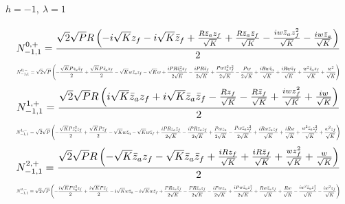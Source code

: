 \documentclass[10pt]{article}
\begin{document}
\paragraph{$h=-1,\ \lambda=1$}
\begin{equation*}
\resizebox{0.98\textwidth}{!}{${\displaystyle N^{0,+}_{-1,1}=\frac{\sqrt{2} \sqrt{P} R \left(- i \sqrt{K} z_f - i \sqrt{K} \bar z_f + \frac{R \bar z_a z_f}{\sqrt{K}} + \frac{R \bar z_a \bar z_f}{\sqrt{K}} - \frac{i w \bar z_a z_f^{2}}{\sqrt{K}} - \frac{i w \bar z_a}{\sqrt{K}}\right)}{2}}$}
\end{equation*}
\begin{equation*}
\resizebox{0.98\textwidth}{!}{${\displaystyle N^{0,-}_{-1,1}=\sqrt{2} \sqrt{P} \left(- \frac{\sqrt{K} P z_a \bar z_f}{2} + \frac{\sqrt{K} P \bar z_a z_f}{2} - \sqrt{K} w \bar z_a z_f - \sqrt{K} w + \frac{i P R \bar z_a^{2} z_f}{2 \sqrt{K}} - \frac{i P R \bar z_f}{2 \sqrt{K}} + \frac{P w \bar z_a^{2} z_f^{2}}{2 \sqrt{K}} - \frac{P w}{2 \sqrt{K}} + \frac{i R w \bar z_a}{\sqrt{K}} + \frac{i R w \bar z_f}{\sqrt{K}} + \frac{w^{2} \bar z_a z_f}{\sqrt{K}} + \frac{w^{2}}{\sqrt{K}}\right)}$}
\end{equation*}
\begin{equation*}
\resizebox{0.98\textwidth}{!}{${\displaystyle N^{1,+}_{-1,1}=\frac{\sqrt{2} \sqrt{P} R \left(i \sqrt{K} \bar z_a z_f + i \sqrt{K} \bar z_a \bar z_f - \frac{R z_f}{\sqrt{K}} - \frac{R \bar z_f}{\sqrt{K}} + \frac{i w z_f^{2}}{\sqrt{K}} + \frac{i w}{\sqrt{K}}\right)}{2}}$}
\end{equation*}
\begin{equation*}
\resizebox{0.98\textwidth}{!}{${\displaystyle N^{1,-}_{-1,1}=\sqrt{2} \sqrt{P} \left(- \frac{\sqrt{K} P \bar z_a^{2} z_f}{2} + \frac{\sqrt{K} P \bar z_f}{2} - \sqrt{K} w \bar z_a - \sqrt{K} w \bar z_f + \frac{i P R z_a \bar z_f}{2 \sqrt{K}} - \frac{i P R \bar z_a z_f}{2 \sqrt{K}} + \frac{P w z_a}{2 \sqrt{K}} - \frac{P w \bar z_a z_f^{2}}{2 \sqrt{K}} + \frac{i R w \bar z_a z_f}{\sqrt{K}} + \frac{i R w}{\sqrt{K}} + \frac{w^{2} \bar z_a z_f^{2}}{\sqrt{K}} + \frac{w^{2} z_f}{\sqrt{K}}\right)}$}
\end{equation*}
\begin{equation*}
\resizebox{0.98\textwidth}{!}{${\displaystyle N^{2,+}_{-1,1}=\frac{\sqrt{2} \sqrt{P} R \left(- \sqrt{K} \bar z_a z_f - \sqrt{K} \bar z_a \bar z_f + \frac{i R z_f}{\sqrt{K}} + \frac{i R \bar z_f}{\sqrt{K}} + \frac{w z_f^{2}}{\sqrt{K}} + \frac{w}{\sqrt{K}}\right)}{2}}$}
\end{equation*}
\begin{equation*}
\resizebox{0.98\textwidth}{!}{${\displaystyle N^{2,-}_{-1,1}=\sqrt{2} \sqrt{P} \left(- \frac{i \sqrt{K} P \bar z_a^{2} z_f}{2} + \frac{i \sqrt{K} P \bar z_f}{2} - i \sqrt{K} w \bar z_a - i \sqrt{K} w \bar z_f + \frac{P R z_a \bar z_f}{2 \sqrt{K}} - \frac{P R \bar z_a z_f}{2 \sqrt{K}} - \frac{i P w z_a}{2 \sqrt{K}} + \frac{i P w \bar z_a z_f^{2}}{2 \sqrt{K}} + \frac{R w \bar z_a z_f}{\sqrt{K}} + \frac{R w}{\sqrt{K}} - \frac{i w^{2} \bar z_a z_f^{2}}{\sqrt{K}} - \frac{i w^{2} z_f}{\sqrt{K}}\right)}$}
\end{equation*}
\end{document}
